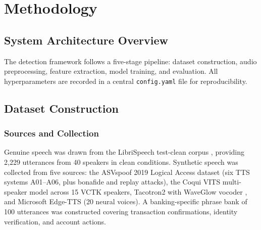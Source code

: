 \documentclass[12pt, a4paper, oneside]{report}
\begin{document}
\chapter{Methodology}
\label{ch:methodology}

\section{System Architecture Overview}

The detection framework follows a five-stage pipeline: dataset construction, audio preprocessing, feature extraction, model training, and evaluation. All hyperparameters are recorded in a central \texttt{config.yaml} file for reproducibility.

\section{Dataset Construction}

\subsection{Sources and Collection}

Genuine speech was drawn from the LibriSpeech test-clean corpus \citep{panayotov2015}, providing 2,229 utterances from 40 speakers in clean conditions. Synthetic speech was collected from five sources: the ASVspoof 2019 Logical Access dataset (six TTS systems A01--A06, plus bonafide and replay attacks), the Coqui VITS multi-speaker model \citep{kim2021vits} across 15 VCTK speakers, Tacotron2 with WaveGlow vocoder \citep{shen2018}, and Microsoft Edge-TTS (20 neural voices). A banking-specific phrase bank of 100 utterances was constructed covering transaction confirmations, identity verification, and account actions.
\end{document}
